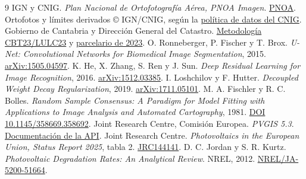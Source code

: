 \documentclass[11pt,a4paper]{article}
\begin{document}
\begin{thebibliography}{9}
 IGN y CNIG. \emph{Plan Nacional de Ortofotografía Aérea, PNOA Imagen}. \href{https://pnoa.ign.es/}{PNOA}. Ortofotos y límites derivados © IGN/CNIG, según la \href{https://centrodedescargas.cnig.es/CentroDescargas/politica-datos}{política de datos del CNIG}.
 Gobierno de Cantabria y Dirección General del Catastro. \href{https://geoservicios.cantabria.es/Series2/CBT23_LULC23/DOC_AUX/Documentacion_LULC_Cantabria_v2_0.pdf}{Metodología CBT23/LULC23} y \href{https://geoservicios.cantabria.es/inspire/rest/services/Cdt/MapServer/15}{parcelario de 2023}.
 O. Ronneberger, P. Fischer y T. Brox. \emph{U-Net: Convolutional Networks for Biomedical Image Segmentation}, 2015. \href{https://arxiv.org/abs/1505.04597}{arXiv:1505.04597}.
 K. He, X. Zhang, S. Ren y J. Sun. \emph{Deep Residual Learning for Image Recognition}, 2016. \href{https://arxiv.org/abs/1512.03385}{arXiv:1512.03385}.
 I. Loshchilov y F. Hutter. \emph{Decoupled Weight Decay Regularization}, 2019. \href{https://arxiv.org/abs/1711.05101}{arXiv:1711.05101}.
 M. A. Fischler y R. C. Bolles. \emph{Random Sample Consensus: A Paradigm for Model Fitting with Applications to Image Analysis and Automated Cartography}, 1981. \href{https://doi.org/10.1145/358669.358692}{DOI 10.1145/358669.358692}.
 Joint Research Centre, Comisión Europea. \emph{PVGIS 5.3}. \href{https://joint-research-centre.ec.europa.eu/photovoltaic-geographical-information-system-pvgis/using-pvgis-5/api-non-interactive-service_en}{Documentación de la API}.
 Joint Research Centre. \emph{Photovoltaics in the European Union, Status Report 2025}, tabla 2. \href{https://publications.jrc.ec.europa.eu/repository/bitstream/JRC144141/JRC144141_01.pdf}{JRC144141}.
 D. C. Jordan y S. R. Kurtz. \emph{Photovoltaic Degradation Rates: An Analytical Review}. NREL, 2012. \href{https://www.osti.gov/biblio/1045052}{NREL/JA-5200-51664}.
\end{thebibliography}
\end{document}
